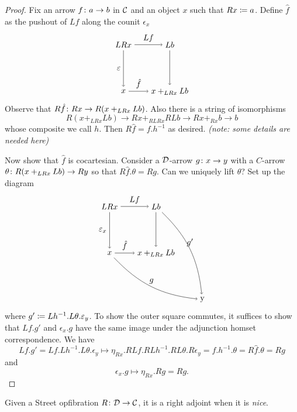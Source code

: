 \documentclass{amsart}
\newcommand{\nice}{\emph{nice}}
\begin{document}
\begin{proof}
	Fix an arrow $ f \colon a \to b $ in $ \mathcal{C} $ and an object $ x $ such that $ Rx \coloneqq a $.  Define $ \hat{f} $ as the pushout of $ Lf $ along the counit $ \epsilon_x $
	\[
	\begin{tikzpicture}
		\node (ul) at (0,2) {$ LRx $};
		\node (ll) at (0,0) {$ x $};
		\node (ur) at (2,2) {$ Lb $};
		\node (lr) at (2,0) {$ x +_{LRx} Lb$};
		\draw [->] (ul) to node [left] {$ \epsilon $} (ll);
		\draw [->] (ul) to node [above] {$ Lf $} (ur);
		\draw [->] (ll) to node [above] {$ \hat{f} $} (lr);
		\draw [->] (ur) to (lr);
	\end{tikzpicture}
	\] 
	Observe that $ R \hat{f} \colon Rx \to R( x +_{LRx} Lb ) $. Also there is a string of isomorphisms  
	\[
		R( x +_{LRx} Lb ) \to Rx +_{RLRx} RLb \to Rx +_{Rx} b \to b
	\]
	whose composite we call $ h $. Then $ R \hat{f} = f . h^{-1} $ as desired.  \emph{(note: some details are needed here)}
	
	Now show that $ \hat{f} $ is cocartesian.  Consider a $ \mathcal{D} $-arrow $ g \colon x \to y $ with a $ C $-arrow $ \theta \colon R( x +_{LRx} Lb ) \to Ry  $ so that $ R \hat{f} . \theta = Rg $.  Can we uniquely lift $ \theta $? Set up the diagram
	\[
	\begin{tikzpicture}
		\node (ul) at (0,2) {$ LRx $};
		\node (ll) at (0,0) {$ x $};
		\node (ur) at (2,2) {$ Lb $};
		\node (lr) at (2,0) {$ x +_{LRx} Lb$};
		\node (comp) at (4,-2) {y};
		\draw [->] (ul) to node [left] {$ \epsilon_x $} (ll);
		\draw [->] (ul) to node [above] {$ Lf $} (ur);
		\draw [->] (ll) to node [above] {$ \hat{f} $} (lr);
		\draw [->] (ur) to (lr);
		\draw [->] (ll) to [bend right=20] node [above] {$ g $} (comp);
		\draw [->] (ur) to [bend left=20] node [above] {$ g' $} (comp);
	\end{tikzpicture}
	\] 
	where $ g' \coloneqq Lh^{-1} . L\theta.\varepsilon_y $.  To show the outer square commutes, it suffices to show that $ Lf . g' $ and $ \epsilon_x . g $ have the same image under the adjunction homset correspondence.  We have
	\[
		Lf . g' = Lf . Lh^{-1} . L\theta.\epsilon_y 
			\mapsto \eta_{Rx} . RLf . RLh^{-1} . RL\theta.R\epsilon_y 
			= f . h^{-1} . \theta  
			= R \hat{f} . \theta 
			= Rg
	\]
	and 
	\[
	\epsilon_x . g \mapsto \eta_{Rx} . Rg = Rg.	
	\]
\end{proof}



\begin{thm}
	Given a Street opfibration $ R \colon \mathcal{D} \to \mathcal{C} $, it is a right adjoint when it is \nice.
\end{thm}
 
\end{document}
